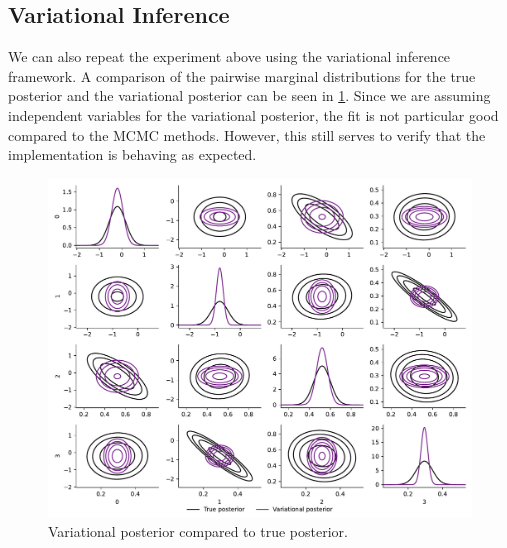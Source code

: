 \subsection{Variational Inference} 
We can also repeat the experiment above using the variational inference framework.
A comparison of the pairwise marginal distributions for the true posterior and the variational posterior can be seen in \cref{fig:vi-simulated}. 
Since we are assuming independent variables for the variational posterior, the fit is not particular good compared to the MCMC methods. 
However, this still serves to verify that the implementation is behaving as expected.
\begin{figure}[htbp]
    \centering
    \includegraphics[width=\linewidth]{Figures/vi-simulated.pdf}
    \caption{Variational posterior compared to true posterior.}
    \label{fig:vi-simulated}
\end{figure}


